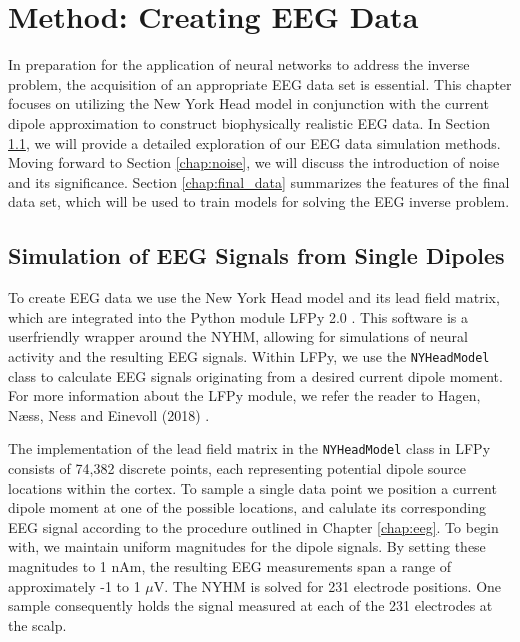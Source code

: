 \documentclass[a4paper, UKenglish, 11pt]{uiomaster}
\begin{document}
\chapter{Method: Creating EEG Data} \label{chap:eeg_data}
In preparation for the application of neural networks to address the inverse problem, the acquisition of an appropriate EEG data set is essential. This chapter focuses on utilizing the New York Head model in conjunction with the current dipole approximation to construct biophysically realistic EEG data.
In Section \ref{chap:simulation}, we will provide a detailed exploration of our EEG data simulation methods. Moving forward to Section \ref{chap:noise}, we will discuss the introduction of noise and its significance. Section \ref{chap:final_data} summarizes the features of the final data set, which will be used to train models for solving the EEG inverse problem.


\section{Simulation of EEG Signals from Single Dipoles} \label{chap:simulation}
To create EEG data we use the New York Head model and its lead field matrix, which are integrated into the Python module LFPy 2.0 \cite{LFPy}. This software is a userfriendly wrapper around the NYHM, allowing for simulations of neural activity and the resulting EEG signals. Within LFPy, we use the \texttt{NYHeadModel} class to calculate EEG signals originating from a desired current dipole moment. For more information about the LFPy module, we refer the reader to Hagen, Næss, Ness and Einevoll (2018) \cite{LFPy}.

The implementation of the lead field matrix in the \texttt{NYHeadModel} class in LFPy consists of 74,382 discrete points, each representing potential dipole source locations within the cortex. To sample a single data point we position a current dipole moment at one of the possible locations, and calulate its corresponding EEG signal according to the procedure outlined in Chapter \ref{chap:eeg}. To begin with, we maintain uniform magnitudes for the dipole signals. By setting these magnitudes to 1 nAm, the resulting EEG measurements span a range of approximately -1 to 1 $\mu$V. The NYHM is solved for 231 electrode positions. One sample consequently holds the signal measured at each of the 231 electrodes at the scalp.
\end{document}
